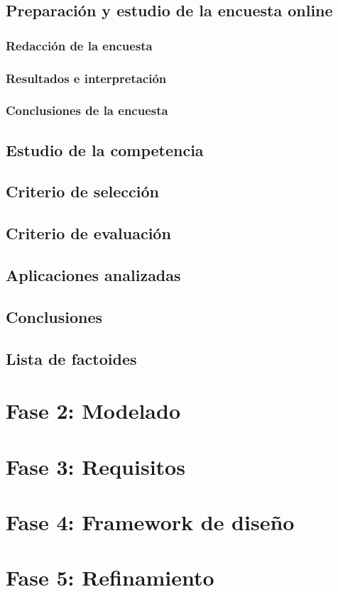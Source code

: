 \documentclass[12pt]{article}
\begin{document}
\subsection{Preparación y estudio de la encuesta online}
\subsubsection{Redacción de la encuesta}
\subsubsection{Resultados e interpretación}
\subsubsection{Conclusiones de la encuesta}
\subsection{Estudio de la competencia}
\subsection{Criterio de selección}
\subsection{Criterio de evaluación}
\subsection{Aplicaciones analizadas}
\subsection{Conclusiones}
\subsection{Lista de factoides}

\section{Fase 2: Modelado}

\section{Fase 3: Requisitos}

\section{Fase 4: Framework de diseño}

\section{Fase 5: Refinamiento}
\end{document}
